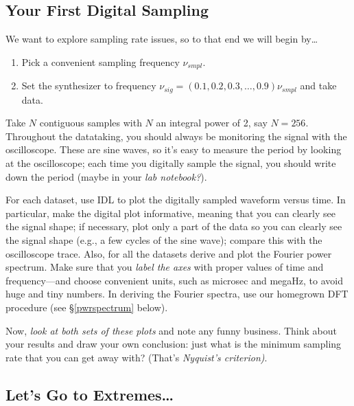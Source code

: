 \documentclass[11pt,preprint]{aastex}
\begin{document}
\subsection{Your First Digital Sampling}

	We want to explore sampling rate issues, so to that end
we will begin by\dots \begin{enumerate}

	\item Pick a convenient sampling frequency $\nu_{smpl}$.  

	\item Set the synthesizer to frequency $\nu_{sig} = (0.1, 0.2,
	  0.3, \dots, 0.9) \nu_{smpl}$ and take data. 

\end{enumerate}

\noindent Take $N$ contiguous samples with $N$ an integral power of 2, say
$N=256$.  Throughout the datataking, you should always be
monitoring the signal with the oscilloscope. These are sine waves, so
it's easy to measure the period by looking at the oscilloscope; each
time you digitally sample the signal, you should write down the period
(maybe in your {\it lab notebook?}).  

For each dataset, use IDL to plot the digitally sampled waveform versus
time.  In particular, make the digital plot informative, meaning that
you can clearly see the signal shape; if necessary, plot only a part of
the data so you can clearly see the signal shape (e.g., a few cycles of
the sine wave); compare this with the oscilloscope trace.  Also, for all
the datasets derive and plot the Fourier power spectrum.  Make sure that
you {\it label the axes} with proper values of time and frequency---and
choose convenient units, such as microsec and megaHz, to avoid huge and
tiny numbers.  In deriving the Fourier spectra, use our homegrown DFT
procedure (see \S \ref{pwrspectrum} below).

Now, {\it look at both sets of these plots} and note any funny business.
Think about your results and draw your own conclusion: just what is the
minimum sampling rate that you can get away with? (That's {\it Nyquist's
  criterion)}. 

\subsection{Let's Go to Extremes\dots}
\end{document}
